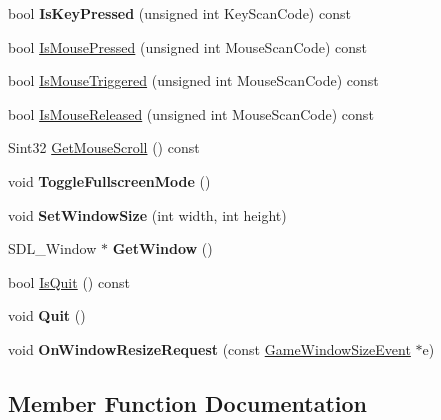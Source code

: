 \begin{DoxyCompactItemize}
bool {\bfseries Is\+Key\+Pressed} (unsigned int Key\+Scan\+Code) const
\item 
bool \hyperlink{classInputManager_a7f316cdb11213c7973a0b601a0193d8a}{Is\+Mouse\+Pressed} (unsigned int Mouse\+Scan\+Code) const
\item 
bool \hyperlink{classInputManager_a036f8dd3a4416c43b0c2942a3c5bb093}{Is\+Mouse\+Triggered} (unsigned int Mouse\+Scan\+Code) const
\item 
bool \hyperlink{classInputManager_af72d6f8ceb3219220b36a6cc447a42db}{Is\+Mouse\+Released} (unsigned int Mouse\+Scan\+Code) const
\item 
Sint32 \hyperlink{classInputManager_a46c6625efeeb61dbde4c21bb81837f0c}{Get\+Mouse\+Scroll} () const
\item 
\mbox{\label{classInputManager_ab5626920e4495bea71dcac27bfc8483a}} 
void {\bfseries Toggle\+Fullscreen\+Mode} ()
\item 
\mbox{\label{classInputManager_ade1cde5e543ad62af1730da51e3f2a5d}} 
void {\bfseries Set\+Window\+Size} (int width, int height)
\item 
\mbox{\label{classInputManager_aba5c089cd936fd808981a22f2d3627f1}} 
S\+D\+L\+\_\+\+Window $\ast$ {\bfseries Get\+Window} ()
\item 
bool \hyperlink{classInputManager_a926e42475408a078ebe5395f95289df2}{Is\+Quit} () const
\item 
\mbox{\label{classInputManager_a28245a4d8a06e4bcc6a4af0356f694ca}} 
void {\bfseries Quit} ()
\item 
\mbox{\label{classInputManager_a014793522c774ec81678f52a4b2b1d38}} 
void {\bfseries On\+Window\+Resize\+Request} (const \hyperlink{classGameWindowSizeEvent}{Game\+Window\+Size\+Event} $\ast$e)
\end{DoxyCompactItemize}


\subsection{Member Function Documentation}
\mbox{\label{classInputManager_a46c6625efeeb61dbde4c21bb81837f0c}} 
